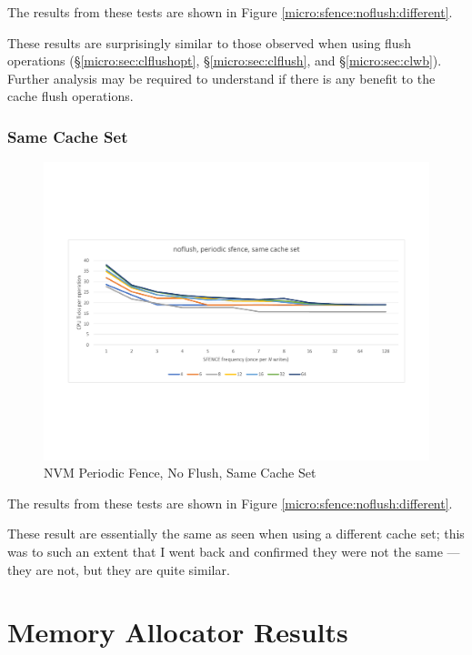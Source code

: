 The results from these tests are shown in Figure \ref{micro:sfence:noflush:different}.

These results are surprisingly similar to those observed when using flush operations (\S \ref{micro:sec:clflushopt},
\S \ref{micro:sec:clflush}, and \S \ref{micro:sec:clwb}).  Further analysis may be required to understand
if there is any benefit to the cache flush operations.

\subsubsection{Same Cache Set}

\begin{figure}
    \centering
    \caption{NVM Periodic Fence, No Flush, Same Cache Set}\label{micro:sfence:noflush:same}
    \includegraphics[scale=0.35]{micro/nvm-noflush-periodic-same.pdf}
\end{figure}

The results from these tests are shown in Figure \ref{micro:sfence:noflush:different}.

These result are essentially the same as seen when using a different cache set; this was
to such an extent that I went back and confirmed they were not the same --- they are not,
but they are quite similar.

\section{Memory Allocator Results}\label{section:results:malloc}

